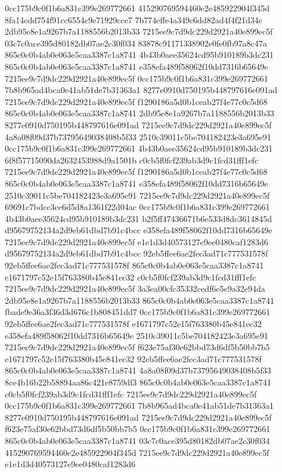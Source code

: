 0cc175b9c0f1b6a831c399e269772661
415290769594460e2e485922904f345d
8fa14cdd754f91cc6554c9e71929cce7
7b774effe4a349c6dd82ad4f4f21d34c
2db95e8e1a9267b7a1188556b2013b33
7215ee9c7d9dc229d2921a40e899ec5f
03c7c0ace395d80182db07ae2c30f034
83878c91171338902e0fe0fb97a8c47a
865c0c0b4ab0e063e5caa3387c1a8741
4b43b0aee35624cd95b910189b3dc231
865c0c0b4ab0e063e5caa3387c1a8741
e358efa489f58062f10dd7316b65649e
7215ee9c7d9dc229d2921a40e899ec5f
0cc175b9c0f1b6a831c399e269772661
7b8b965ad4bca0e41ab51de7b31363a1
8277e0910d750195b448797616e091ad
7215ee9c7d9dc229d2921a40e899ec5f
f1290186a5d0b1ceab27f4e77c0c5d68
865c0c0b4ab0e063e5caa3387c1a8741
2db95e8e1a9267b7a1188556b2013b33
8277e0910d750195b448797616e091ad
7215ee9c7d9dc229d2921a40e899ec5f
4a8a08f09d37b73795649038408b5f33
2510c39011c5be704182423e3a695e91
0cc175b9c0f1b6a831c399e269772661
4b43b0aee35624cd95b910189b3dc231
6f8f57715090da2632453988d9a1501b
c0cb5f0fcf239ab3d9c1fcd31fff1efc
7215ee9c7d9dc229d2921a40e899ec5f
f1290186a5d0b1ceab27f4e77c0c5d68
865c0c0b4ab0e063e5caa3387c1a8741
e358efa489f58062f10dd7316b65649e
2510c39011c5be704182423e3a695e91
7215ee9c7d9dc229d2921a40e899ec5f
69691c7bdcc3ce6d5d8a1361f22d04ac
0cc175b9c0f1b6a831c399e269772661
4b43b0aee35624cd95b910189b3dc231
b2f5ff47436671b6e533d8dc3614845d
d95679752134a2d9eb61dbd7b91c4bcc
e358efa489f58062f10dd7316b65649e
7215ee9c7d9dc229d2921a40e899ec5f
e1e1d3d40573127e9ee0480caf1283d6
d95679752134a2d9eb61dbd7b91c4bcc
92eb5ffee6ae2fec3ad71c777531578f
92eb5ffee6ae2fec3ad71c777531578f
865c0c0b4ab0e063e5caa3387c1a8741
e1671797c52e15f763380b45e841ec32
c0cb5f0fcf239ab3d9c1fcd31fff1efc
7215ee9c7d9dc229d2921a40e899ec5f
3a3ea00cfc35332cedf6e5e9a32e94da
2db95e8e1a9267b7a1188556b2013b33
865c0c0b4ab0e063e5caa3387c1a8741
fbade9e36a3f36d3d676c1b808451dd7
0cc175b9c0f1b6a831c399e269772661
92eb5ffee6ae2fec3ad71c777531578f
e1671797c52e15f763380b45e841ec32
e358efa489f58062f10dd7316b65649e
2510c39011c5be704182423e3a695e91
7215ee9c7d9dc229d2921a40e899ec5f
f623e75af30e62bbd73d6df5b50bb7b5
e1671797c52e15f763380b45e841ec32
92eb5ffee6ae2fec3ad71c777531578f
865c0c0b4ab0e063e5caa3387c1a8741
4a8a08f09d37b73795649038408b5f33
8ce4b16b22b58894aa86c421e8759df3
865c0c0b4ab0e063e5caa3387c1a8741
c0cb5f0fcf239ab3d9c1fcd31fff1efc
7215ee9c7d9dc229d2921a40e899ec5f
0cc175b9c0f1b6a831c399e269772661
7b8b965ad4bca0e41ab51de7b31363a1
8277e0910d750195b448797616e091ad
7215ee9c7d9dc229d2921a40e899ec5f
f623e75af30e62bbd73d6df5b50bb7b5
0cc175b9c0f1b6a831c399e269772661
865c0c0b4ab0e063e5caa3387c1a8741
03c7c0ace395d80182db07ae2c30f034
415290769594460e2e485922904f345d
7215ee9c7d9dc229d2921a40e899ec5f
e1e1d3d40573127e9ee0480caf1283d6
